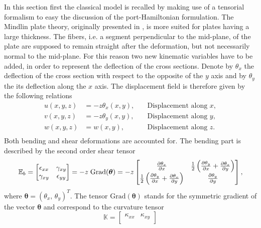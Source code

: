 \documentclass[preprint,12pt]{elsarticle}
\newcommand{\RevOne}[1]{\textcolor{blue!80!black}{#1}}
\begin{document}
\RevOne{In this section first the classical model is recalled by making use of a tensorial formalism to easy the discussion of the port-Hamiltonian formulation.} The Mindlin plate theory, originally presented in \cite{mindlin}, is more suited for plates having a large thickness. The fibers, i.e. a segment perpendicular to the mid-plane, of the plate are supposed to remain straight after the deformation, but not necessarily normal to the mid-plane. For this reason two new kinematic variables have to be added, in order to represent the deflection of the cross sections. \RevOne{ Denote by $\theta_x$ the deflection of the cross section with respect to the opposite of the $y$ axis and by $\theta_y$ the its deflection along the $x$ axis. The displacement field is therefore given by the following relations
\begin{equation}
\begin{aligned}
u(x,y,z) &= -z \theta_x(x,y), \quad &\text{Displacement along $x$}, \\
v(x,y,z) &= -z \theta_y(x,y), \quad &\text{Displacement along $y$}, \\
w(x,y,z) &= w(x,y),  \quad &\text{Displacement along $z$}. \\
\end{aligned}
\end{equation}
Both bending and shear deformations are accounted for. The bending part is described by the second order shear tensor
\begin{equation}
\mathbb{E}_b = 
\begin{bmatrix}
\epsilon_{xx} & \gamma_{xy} \\
\gamma_{xy} & \epsilon_{yy} \\
\end{bmatrix} = -z \; \mathrm{Grad}(\bm\theta) = -z
\begin{bmatrix}
\diffp{\theta_x}{x} & \frac{1}{2} \left( \diffp{\theta_y}{x} + \diffp{\theta_x}{y} \right)\\
\frac{1}{2} \left( \diffp{\theta_y}{x} + \diffp{\theta_x}{y} \right) & \diffp{\theta_y}{y} \\
\end{bmatrix},
\end{equation}
where $\bm{\theta} = (\theta_x, \, \theta_y)^T$. The tensor $\mathrm{Grad}(\bm{\theta})$ stands for the symmetric gradient of the vector $\bm{\theta}$ and correspond to the curvature tensor
\begin{equation}
\mathbb{K} = \begin{bmatrix}
\kappa_{xx} &  \kappa_{xy}\\

\end{bmatrix}
\end{equation}}
\end{document}
